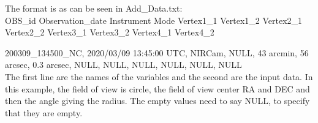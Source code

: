 The format is as can be seen in Add\_Data.txt:\\
OBS\_id Observation\_date Instrument Mode Vertex1\_1 Vertex1\_2 Vertex2\_1 Vertex2\_2 Vertex3\_1 Vertex3\_2 Vertex4\_1 Vertex4\_2

200309\_134500\_NC, 2020/03/09 13:45:00 UTC, NIRCam, NULL, 43 arcmin, 56 arcsec, 0.3 arcsec, NULL, NULL, NULL, NULL, NULL, NULL \\
The first line are the names of the variables and the second are the input data. In this example, the field of view is circle, the field of view center RA and DEC and then the angle giving the radius. The empty values need to say NULL, to specify that they are empty.



